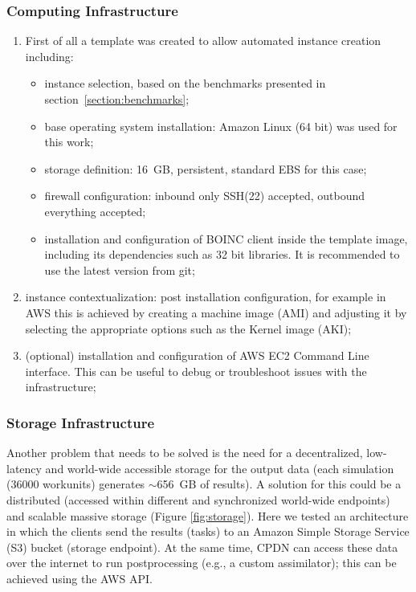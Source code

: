 \documentclass[journal abbreviation, manuscript]{copernicus}
\begin{document}
\subsubsection{Computing Infrastructure}
\begin{enumerate}
\item First of all a template was created to allow automated instance creation including:

\begin{itemize}
	\item instance selection, based on the benchmarks presented in section~\ref{section:benchmarks};
	\item base operating system installation: Amazon Linux (64 bit) was used for this work;
	\item storage definition: 16~GB, persistent, standard EBS for this case;
        \item firewall configuration: inbound only SSH(22) accepted, outbound everything accepted;
        \item installation and configuration of BOINC client inside the template image, including its dependencies such as 32 bit libraries. It is recommended to use the latest version from git;%

\end{itemize}

\item instance contextualization: post installation configuration, for example in AWS this is achieved by creating a machine image (AMI) and adjusting it by selecting the appropriate options such as the Kernel image (AKI);
\item (optional) installation and configuration of AWS EC2 Command Line interface. This can be useful to debug or troubleshoot issues with the infrastructure;


\end{enumerate}

\subsubsection{Storage Infrastructure}
Another problem that needs to be solved is the need for a decentralized, low-latency and world-wide accessible storage for the output data (each simulation (36000 workunits) generates $\sim$656~GB of results). A solution for this could be a distributed (accessed within different and synchronized world-wide endpoints) and scalable massive storage (Figure \ref{fig:storage}). Here we tested an architecture in which the clients send the results (tasks) to an Amazon Simple Storage Service (S3) bucket (storage endpoint). At the same time, CPDN can access these data over the internet to run postprocessing (e.g., a custom assimilator); this can be achieved using the AWS API.
\end{document}
